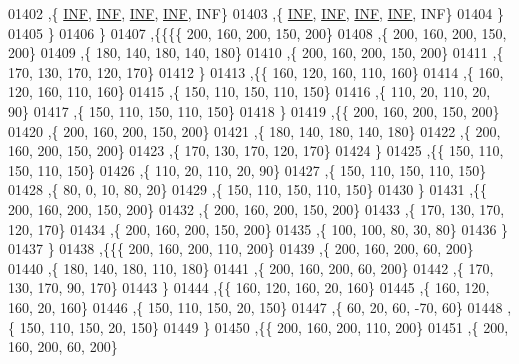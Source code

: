 \begin{DoxyCode}
01402     ,\{   \hyperlink{energy__const_8h_a12c2040f25d8e3a7b9e1c2024c618cb6}{INF},   \hyperlink{energy__const_8h_a12c2040f25d8e3a7b9e1c2024c618cb6}{INF},   \hyperlink{energy__const_8h_a12c2040f25d8e3a7b9e1c2024c618cb6}{INF},   \hyperlink{energy__const_8h_a12c2040f25d8e3a7b9e1c2024c618cb6}{INF},   INF\}
01403     ,\{   \hyperlink{energy__const_8h_a12c2040f25d8e3a7b9e1c2024c618cb6}{INF},   \hyperlink{energy__const_8h_a12c2040f25d8e3a7b9e1c2024c618cb6}{INF},   \hyperlink{energy__const_8h_a12c2040f25d8e3a7b9e1c2024c618cb6}{INF},   \hyperlink{energy__const_8h_a12c2040f25d8e3a7b9e1c2024c618cb6}{INF},   INF\}
01404     \}
01405    \}
01406   \}
01407  ,\{\{\{\{   200,   160,   200,   150,   200\}
01408     ,\{   200,   160,   200,   150,   200\}
01409     ,\{   180,   140,   180,   140,   180\}
01410     ,\{   200,   160,   200,   150,   200\}
01411     ,\{   170,   130,   170,   120,   170\}
01412     \}
01413    ,\{\{   160,   120,   160,   110,   160\}
01414     ,\{   160,   120,   160,   110,   160\}
01415     ,\{   150,   110,   150,   110,   150\}
01416     ,\{   110,    20,   110,    20,    90\}
01417     ,\{   150,   110,   150,   110,   150\}
01418     \}
01419    ,\{\{   200,   160,   200,   150,   200\}
01420     ,\{   200,   160,   200,   150,   200\}
01421     ,\{   180,   140,   180,   140,   180\}
01422     ,\{   200,   160,   200,   150,   200\}
01423     ,\{   170,   130,   170,   120,   170\}
01424     \}
01425    ,\{\{   150,   110,   150,   110,   150\}
01426     ,\{   110,    20,   110,    20,    90\}
01427     ,\{   150,   110,   150,   110,   150\}
01428     ,\{    80,     0,    10,    80,    20\}
01429     ,\{   150,   110,   150,   110,   150\}
01430     \}
01431    ,\{\{   200,   160,   200,   150,   200\}
01432     ,\{   200,   160,   200,   150,   200\}
01433     ,\{   170,   130,   170,   120,   170\}
01434     ,\{   200,   160,   200,   150,   200\}
01435     ,\{   100,   100,    80,    30,    80\}
01436     \}
01437    \}
01438   ,\{\{\{   200,   160,   200,   110,   200\}
01439     ,\{   200,   160,   200,    60,   200\}
01440     ,\{   180,   140,   180,   110,   180\}
01441     ,\{   200,   160,   200,    60,   200\}
01442     ,\{   170,   130,   170,    90,   170\}
01443     \}
01444    ,\{\{   160,   120,   160,    20,   160\}
01445     ,\{   160,   120,   160,    20,   160\}
01446     ,\{   150,   110,   150,    20,   150\}
01447     ,\{    60,    20,    60,   -70,    60\}
01448     ,\{   150,   110,   150,    20,   150\}
01449     \}
01450    ,\{\{   200,   160,   200,   110,   200\}
01451     ,\{   200,   160,   200,    60,   200\}

\end{DoxyCode}
